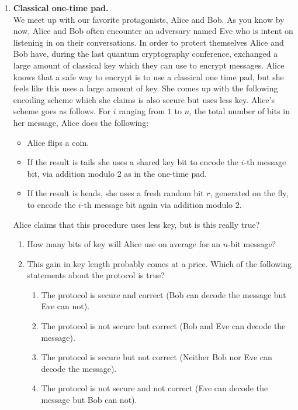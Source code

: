 \documentclass[12pt]{article}
\begin{document}
\begin{enumerate}
\item {\bf Classical one-time pad.}\\
We meet up with our favorite protagonists, Alice and Bob. As you know by now, Alice and Bob often encounter an adversary named Eve who is intent on listening in on their conversations. In order to protect themselves Alice and Bob have, during the last quantum cryptography conference, exchanged a large amount of classical key which they can use to encrypt messages. Alice knows that a safe way to encrypt is to use a classical one time pad, but she feels like this uses a large amount of key. She comes up with the following encoding scheme which she claims is also secure but uses less key. Alice's scheme goes as follows. For $i$ ranging from $1$ to $n$, the total number of bits in her message, Alice does the following: 
\begin{itemize}
\item Alice flips a coin.
\item If the result is tails she uses a shared key bit to encode the $i$-th message bit, via addition modulo 2 as in the one-time pad.
\item If the result is heads,  she uses a fresh random bit $r$, generated on the fly, to encode the $i$-th message bit again via addition modulo 2. 
\end{itemize}
Alice claims that this procedure uses less key, but is this really true?
\begin{enumerate}
\item  How many bits of key will Alice use on average for an $n$-bit message? 
\item This gain in key length probably comes at a price. Which of the following statements about the protocol is true?
\begin{enumerate}
\item The protocol is secure and correct (Bob can decode the message but Eve can not).
\item The protocol is not secure but correct (Bob and Eve can decode the message).
\item The protocol is secure but not correct (Neither Bob nor Eve can decode the message).
\item The protocol is not secure and not correct (Eve can decode the message but Bob can not).
\end{enumerate}
\end{enumerate}


\end{enumerate}
\end{document}
